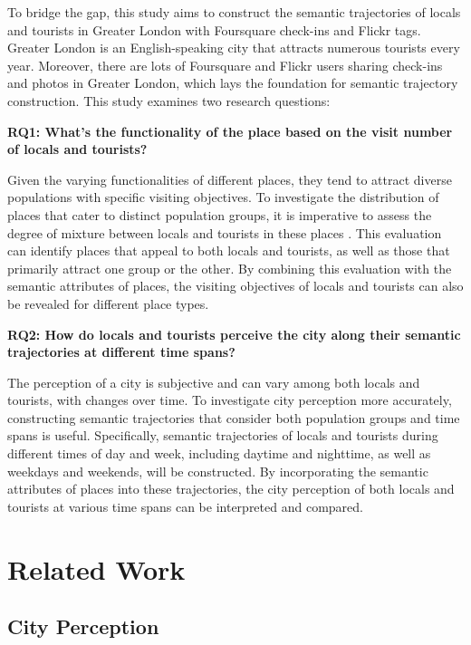 \documentclass{article}
\begin{document}
To bridge the gap, this study aims to construct the semantic trajectories of locals and tourists in Greater London with Foursquare check-ins and Flickr tags. Greater London is an English-speaking city that attracts numerous tourists every year. Moreover, there are lots of Foursquare and Flickr users sharing check-ins and photos in Greater London, which lays the foundation for semantic trajectory construction. This study examines two research questions:

\textbf{RQ1: What’s the functionality of the place based on the visit number of locals and tourists?}

Given the varying functionalities of different places, they tend to attract diverse populations with specific visiting objectives. To investigate the distribution of places that cater to distinct population groups, it is imperative to assess the degree of mixture between locals and tourists in these places \citep{li_analyzing_2018}. This evaluation can identify places that appeal to both locals and tourists, as well as those that primarily attract one group or the other. By combining this evaluation with the semantic attributes of places, the visiting objectives of locals and tourists can also be revealed for different place types.

\textbf{RQ2: How do locals and tourists perceive the city along their semantic trajectories at different time spans?}

The perception of a city is subjective and can vary among both locals and tourists, with changes over time. To investigate city perception more accurately, constructing semantic trajectories that consider both population groups and time spans is useful. Specifically, semantic trajectories of locals and tourists during different times of day and week, including daytime and nighttime, as well as weekdays and weekends, will be constructed. By incorporating the semantic attributes of places into these trajectories, the city perception of both locals and tourists at various time spans can be interpreted and compared.
\newpage

\section{Related Work}
\subsection{City Perception}
\end{document}
